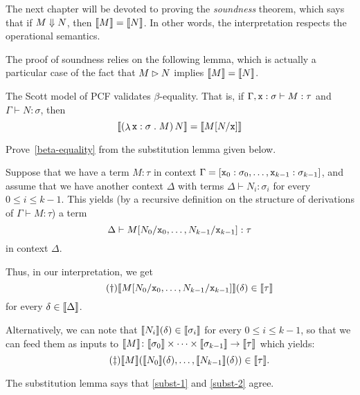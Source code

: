 The next chapter will be devoted to proving the \emph{soundness} theorem, which
says that if \(M \Downarrow N\), then \(\llbracket M\rrbracket = \llbracket N\rrbracket\). In other words,
the interpretation respects the operational semantics.

The proof of soundness relies on the following lemma, which is actually a
particular case of the fact that \(M \rhd N\) implies
\(\llbracket M\rrbracket = \llbracket N\rrbracket\).

\begin{lemma}\label{beta-equality}
  The Scott model of PCF validates \(\beta\)-equality. That is, if
  \(\Gamma,\mathtt x : \sigma \vdash M : \tau\) and \(\Gamma \vdash N : \sigma\),
  then
  \[
    \densem*{\pa*{\lambdadot{\var x : \sigma}{M}}\,N} = \densem{M[N/\var x]}
  \]
\end{lemma}

\begin{exercise}\label{exer:beta-equality}
  Prove~\cref{beta-equality} from the substitution lemma given below.
\end{exercise}


Suppose that we have a term \(M : \tau\) in context
\(\Gamma = [\mathtt x_0 : \sigma_0 , \dots , \mathtt x_{k-1} : \sigma_{k-1}]\), and
assume that we have another context \(\Delta\) with terms
\(\Delta \vdash N_i : \sigma_i\) for every \(0 \leq i \leq k-1\).
%
This yields (by a recursive definition on the structure of derivations of
\(\Gamma \vdash M : \tau\)) a term
\[
  \Delta \vdash M[N_0/\mathtt x_0,\dots,N_{k-1}/\mathtt x_{k-1}] : \tau
\]
in context \(\Delta\).

Thus, in our interpretation, we get
\begin{equation*}\label{subst-1}\tag{\(\dagger\)}
  \llbracket M[N_0/\mathtt x_0,\dots,N_{k-1}/\mathtt x_{k-1}]\rrbracket(\delta) \in \llbracket\tau\rrbracket
\end{equation*}
for every \(\delta \in \llbracket\Delta\rrbracket\).

Alternatively, we can note that \(\llbracket N_i\rrbracket(\delta) \in \llbracket\sigma_i\rrbracket\)
for every \(0 \leq i \leq k-1\), so that we can feed them as inputs to
\(\llbracket M\rrbracket \colon \llbracket\sigma_0\rrbracket \times \cdots \times \llbracket\sigma_{k-1}\rrbracket
\to \llbracket\tau\rrbracket\) which yields:
\begin{equation*}\label{subst-2}\tag{\(\ddagger\)}
  \densem{M}\pa*{\densem{N_0}(\delta),\dots,\densem{N_{k-1}}(\delta)} \in \densem{\tau}.
\end{equation*}

The substitution lemma says that \eqref{subst-1} and \eqref{subst-2} agree.

